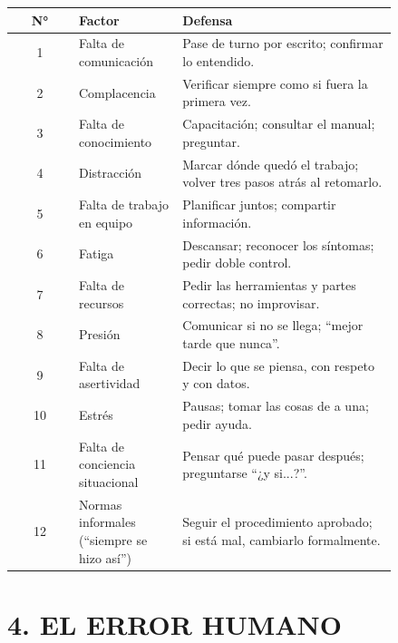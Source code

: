 \begin{center}
\small
\begin{tabular}{|c|p{0.27\linewidth}|p{0.57\linewidth}|}
\hline
\textbf{N°} & \textbf{Factor} & \textbf{Defensa} \\ \hline
1 & Falta de comunicación & Pase de turno por escrito; confirmar lo entendido. \\ \hline
2 & Complacencia & Verificar siempre como si fuera la primera vez. \\ \hline
3 & Falta de conocimiento & Capacitación; consultar el manual; preguntar. \\ \hline
4 & Distracción & Marcar dónde quedó el trabajo; volver tres pasos atrás al retomarlo. \\ \hline
5 & Falta de trabajo en equipo & Planificar juntos; compartir información. \\ \hline
6 & Fatiga & Descansar; reconocer los síntomas; pedir doble control. \\ \hline
7 & Falta de recursos & Pedir las herramientas y partes correctas; no improvisar. \\ \hline
8 & Presión & Comunicar si no se llega; ``mejor tarde que nunca''. \\ \hline
9 & Falta de asertividad & Decir lo que se piensa, con respeto y con datos. \\ \hline
10 & Estrés & Pausas; tomar las cosas de a una; pedir ayuda. \\ \hline
11 & Falta de conciencia situacional & Pensar qué puede pasar después; preguntarse ``¿y si...?''. \\
\hline
12 & Normas informales (``siempre se hizo así'') & Seguir el procedimiento aprobado; si está mal,
cambiarlo formalmente. \\ \hline
\end{tabular}
\end{center}

\section*{4. EL ERROR HUMANO}

